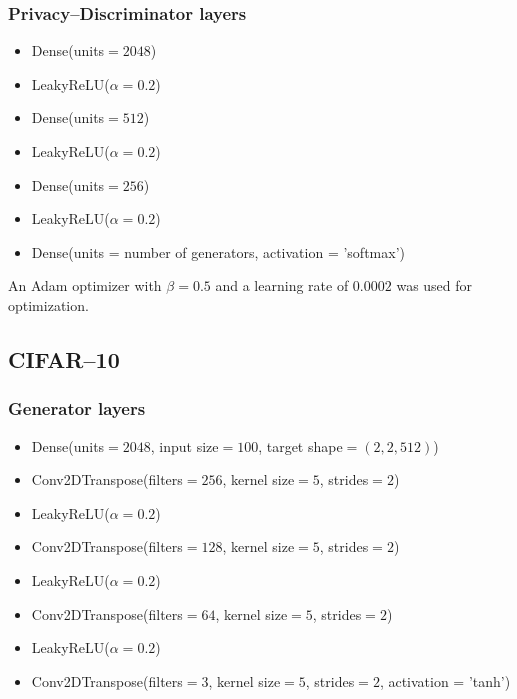 \documentclass{article}
\begin{document}
\subsubsection*{Privacy--Discriminator layers}
\begin{itemize}
\itemsep0em
    \item Dense(units$=2048$)
    \item LeakyReLU($\alpha=0.2$)
    \item Dense(units$=512$)
    \item LeakyReLU($\alpha=0.2$)
    \item Dense(units$=256$)
    \item LeakyReLU($\alpha=0.2$)
    \item Dense(units = number of generators, activation = 'softmax')
\end{itemize}

An Adam optimizer with $\beta = 0.5$ and a learning rate of $0.0002$ was used for optimization.

\subsection*{CIFAR--10}
\subsubsection*{Generator layers}
\begin{itemize}
\itemsep0em
    \item Dense(units$=2048$, input size$=100$, target shape$= (2, 2, 512)$)
    \item Conv2DTranspose(filters$= 256$, kernel size$=5$, strides$=2$)
    \item LeakyReLU($\alpha=0.2$)
    \item Conv2DTranspose(filters$= 128$, kernel size$=5$, strides$=2$)
    \item LeakyReLU($\alpha=0.2$)
    \item Conv2DTranspose(filters$= 64$, kernel size$=5$, strides$=2$)
    \item LeakyReLU($\alpha=0.2$)
    \item Conv2DTranspose(filters$= 3$, kernel size$=5$, strides$=2$, activation = 'tanh')
\end{itemize}
\end{document}
